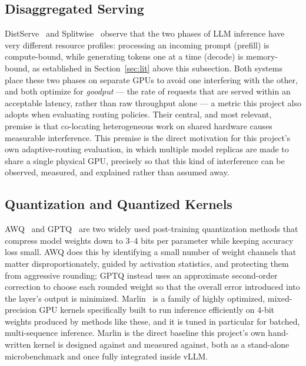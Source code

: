 \documentclass[11pt,a4paper]{article}
\begin{document}
\subsection{Disaggregated Serving}
DistServe~\cite{distserve} and Splitwise~\cite{splitwise} observe that the two phases of LLM inference have very
different resource profiles: processing an incoming prompt (prefill) is compute-bound, while generating tokens one
at a time (decode) is memory-bound, as established in Section~\ref{sec:lit} above this subsection. Both systems
place these two phases on separate GPUs to avoid one interfering with the other, and both optimize for
\emph{goodput} --- the rate of requests that are served within an acceptable latency, rather than raw throughput
alone --- a metric this project also adopts when evaluating routing policies. Their central, and most relevant,
premise is that co-locating heterogeneous work on shared hardware causes measurable interference. This premise is
the direct motivation for this project's own adaptive-routing evaluation, in which multiple model replicas are made
to share a single physical GPU, precisely so that this kind of interference can be observed, measured, and explained
rather than assumed away.

\subsection{Quantization and Quantized Kernels}
AWQ~\cite{awq} and GPTQ~\cite{gptq} are two widely used post-training quantization methods that compress model
weights down to 3--4 bits per parameter while keeping accuracy loss small. AWQ does this by identifying a small
number of weight channels that matter disproportionately, guided by activation statistics, and protecting them from
aggressive rounding; GPTQ instead uses an approximate second-order correction to choose each rounded weight so that
the overall error introduced into the layer's output is minimized. Marlin~\cite{marlin} is a family of highly
optimized, mixed-precision GPU kernels specifically built to run inference efficiently on 4-bit weights produced by
methods like these, and it is tuned in particular for batched, multi-sequence inference. Marlin is the direct
baseline this project's own hand-written kernel is designed against and measured against, both as a stand-alone
microbenchmark and once fully integrated inside vLLM.
\end{document}
